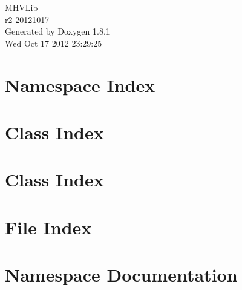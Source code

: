 \documentclass{book}
\begin{document}
\hypersetup{pageanchor=false,citecolor=blue}
\begin{titlepage}
\vspace*{7cm}
\begin{center}
{\Large M\-H\-V\-Lib \\[1ex]\large r2-\/20121017 }\\
\vspace*{1cm}
{\large Generated by Doxygen 1.8.1}\\
\vspace*{0.5cm}
{\small Wed Oct 17 2012 23:29:25}\\
\end{center}
\end{titlepage}
\clearemptydoublepage
{}
\tableofcontents
\clearemptydoublepage
{}
\hypersetup{pageanchor=true,citecolor=blue}
\chapter{Namespace Index}

\chapter{Class Index}

\chapter{Class Index}

\chapter{File Index}

\chapter{Namespace Documentation}


\end{document}

